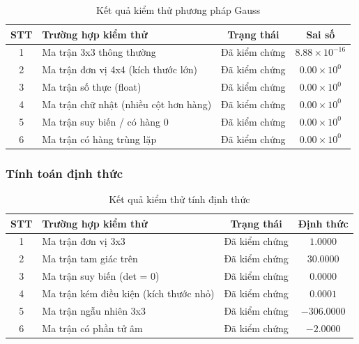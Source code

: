 \begin{table}[h!]
    \centering
    \renewcommand{\arraystretch}{1.3}
    \setlength{\tabcolsep}{6pt}
    \begin{tabular}{|c|p{7.5cm}|c|c|}
        \hline
        \rowcolor[rgb]{0.8, 0.9, 1.0}
        \textbf{STT} & \textbf{Trường hợp kiểm thử} & \textbf{Trạng thái} & \textbf{Sai số} \\ \hline
        
        1 & Ma trận 3x3 thông thường & Đã kiểm chứng & $8.88\times10^{-16}$ \\ \hline
        2 & Ma trận đơn vị 4x4 (kích thước lớn) & Đã kiểm chứng & $0.00\times10^{0}$ \\ \hline
        3 & Ma trận số thực (float) & Đã kiểm chứng & $0.00\times10^{0}$ \\ \hline
        4 & Ma trận chữ nhật (nhiều cột hơn hàng) & Đã kiểm chứng & $0.00\times10^{0}$ \\ \hline
        5 & Ma trận suy biến / có hàng 0 & Đã kiểm chứng & $0.00\times10^{0}$ \\ \hline
        6 & Ma trận có hàng trùng lặp & Đã kiểm chứng & $0.00\times10^{0}$ \\ \hline

    \end{tabular}
    \caption{Kết quả kiểm thử phương pháp Gauss}
\end{table}

\subsubsection{Tính toán định thức}

\begin{table}[h!]
    \centering
    \renewcommand{\arraystretch}{1.3}
    \setlength{\tabcolsep}{6pt}
    \begin{tabular}{|c|p{7.5cm}|c|c|}
        \hline
        \rowcolor[rgb]{0.8, 0.9, 1.0}
        \textbf{STT} & \textbf{Trường hợp kiểm thử} & \textbf{Trạng thái} & \textbf{Định thức} \\ \hline
        
        1 & Ma trận đơn vị 3x3 & Đã kiểm chứng & $1.0000$ \\ \hline
        2 & Ma trận tam giác trên & Đã kiểm chứng & $30.0000$ \\ \hline
        3 & Ma trận suy biến (det = 0) & Đã kiểm chứng & $0.0000$ \\ \hline
        4 & Ma trận kém điều kiện (kích thước nhỏ) & Đã kiểm chứng & $0.0001$ \\ \hline
        5 & Ma trận ngẫu nhiên 3x3 & Đã kiểm chứng & $-306.0000$ \\ \hline
        6 & Ma trận có phần tử âm & Đã kiểm chứng & $-2.0000$ \\ \hline

    \end{tabular}
    \caption{Kết quả kiểm thử tính định thức}
\end{table}

